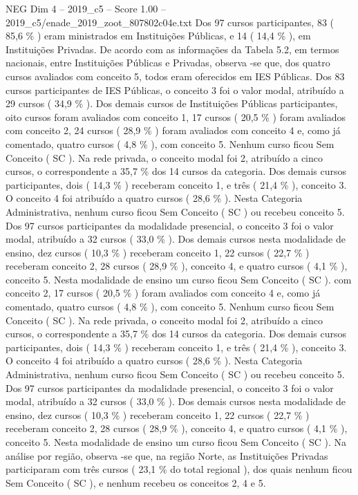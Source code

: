 \begin{textsample}{NEG Dim 4 – 2019\_c5 – Score 1.00 – 2019\_c5/enade\_2019\_zoot\_807802c04e.txt}
Dos 97 cursos participantes, 83 ( 85,6 \% ) eram ministrados em Instituições Públicas, e 14 ( 14,4 \% ), em Instituições Privadas.
De acordo com as informações da Tabela 5.2, em termos nacionais, entre Instituições Públicas e Privadas, observa -se que, dos quatro cursos avaliados com conceito 5, todos eram oferecidos em IES Públicas.
Dos 83 cursos participantes de IES Públicas, o conceito 3 foi o valor modal, atribuído a 29 cursos ( 34,9 \% ).
Dos demais cursos de Instituições Públicas participantes, oito cursos foram avaliados com conceito 1, 17 cursos ( 20,5 \% ) foram avaliados com conceito 2, 24 cursos ( 28,9 \% ) foram avaliados com conceito 4 e, como já comentado, quatro cursos ( 4,8 \% ), com conceito 5.
Nenhum curso ficou Sem Conceito ( SC ).
Na rede privada, o conceito modal foi 2, atribuído a cinco cursos, o correspondente a 35,7 \% dos 14 cursos da categoria.
Dos demais cursos participantes, dois ( 14,3 \% ) receberam conceito 1, e três ( 21,4 \% ), conceito 3.
O conceito 4 foi atribuído a quatro cursos ( 28,6 \% ).
Nesta Categoria Administrativa, nenhum curso ficou Sem Conceito ( SC ) ou recebeu conceito 5.
Dos 97 cursos participantes da modalidade presencial, o conceito 3 foi o valor modal, atribuído a 32 cursos ( 33,0 \% ).
Dos demais cursos nesta modalidade de ensino, dez cursos ( 10,3 \% ) receberam conceito 1, 22 cursos ( 22,7 \% ) receberam conceito 2, 28 cursos ( 28,9 \% ), conceito 4, e quatro cursos ( 4,1 \% ), conceito 5.
Nesta modalidade de ensino um curso ficou Sem Conceito ( SC ). com conceito 2, 17 cursos ( 20,5 \% ) foram avaliados com conceito 4 e, como já comentado, quatro cursos ( 4,8 \% ), com conceito 5.
Nenhum curso ficou Sem Conceito ( SC ).
Na rede privada, o conceito modal foi 2, atribuído a cinco cursos, o correspondente a 35,7 \% dos 14 cursos da categoria.
Dos demais cursos participantes, dois ( 14,3 \% ) receberam conceito 1, e três ( 21,4 \% ), conceito 3.
O conceito 4 foi atribuído a quatro cursos ( 28,6 \% ).
Nesta Categoria Administrativa, nenhum curso ficou Sem Conceito ( SC ) ou recebeu conceito 5.
Dos 97 cursos participantes da modalidade presencial, o conceito 3 foi o valor modal, atribuído a 32 cursos ( 33,0 \% ).
Dos demais cursos nesta modalidade de ensino, dez cursos ( 10,3 \% ) receberam conceito 1, 22 cursos ( 22,7 \% ) receberam conceito 2, 28 cursos ( 28,9 \% ), conceito 4, e quatro cursos ( 4,1 \% ), conceito 5.
Nesta modalidade de ensino um curso ficou Sem Conceito ( SC ).
Na análise por região, observa -se que, na região Norte, as Instituições Privadas participaram com três cursos ( 23,1 \% do total regional ), dos quais nenhum ficou Sem Conceito ( SC ), e nenhum recebeu os conceitos 2, 4 e 5.

\end{textsample}

